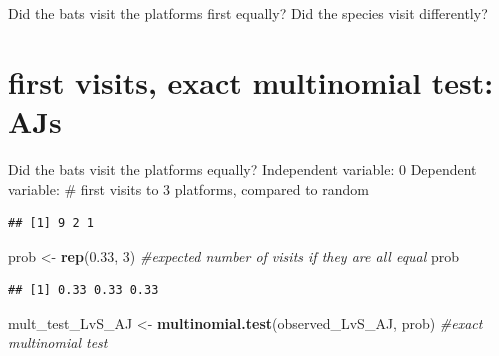 \documentclass[]{article}
\newenvironment{Shaded}{\begin{snugshade}}{\end{snugshade}}
\newcommand{\KeywordTok}[1]{\textcolor[rgb]{0.13,0.29,0.53}{\textbf{{#1}}}}
\newcommand{\DecValTok}[1]{\textcolor[rgb]{0.00,0.00,0.81}{{#1}}}
\newcommand{\FloatTok}[1]{\textcolor[rgb]{0.00,0.00,0.81}{{#1}}}
\newcommand{\StringTok}[1]{\textcolor[rgb]{0.31,0.60,0.02}{{#1}}}
\newcommand{\CommentTok}[1]{\textcolor[rgb]{0.56,0.35,0.01}{\textit{{#1}}}}
\newcommand{\NormalTok}[1]{{#1}}
\begin{document}
Did the bats visit the platforms first equally? Did the species visit
differently?

\section{first visits, exact multinomial test:
AJs}\label{first-visits-exact-multinomial-test-ajs}

Did the bats visit the platforms equally? Independent variable: 0
Dependent variable: \# first visits to 3 platforms, compared to random

\begin{Shaded}
\end{Shaded}

\begin{verbatim}
## [1] 9 2 1
\end{verbatim}

\begin{Shaded}
\begin{Highlighting}[]
\NormalTok{prob <-}\StringTok{ }\KeywordTok{rep}\NormalTok{(}\FloatTok{0.33}\NormalTok{, }\DecValTok{3}\NormalTok{) }\CommentTok{#expected number of visits if they are all equal}
\NormalTok{prob }
\end{Highlighting}
\end{Shaded}

\begin{verbatim}
## [1] 0.33 0.33 0.33
\end{verbatim}

\begin{Shaded}
\begin{Highlighting}[]
\NormalTok{mult_test_LvS_AJ <-}\StringTok{ }\KeywordTok{multinomial.test}\NormalTok{(observed_LvS_AJ, prob) }\CommentTok{#exact multinomial test}
\end{Highlighting}
\end{Shaded}
\end{document}
